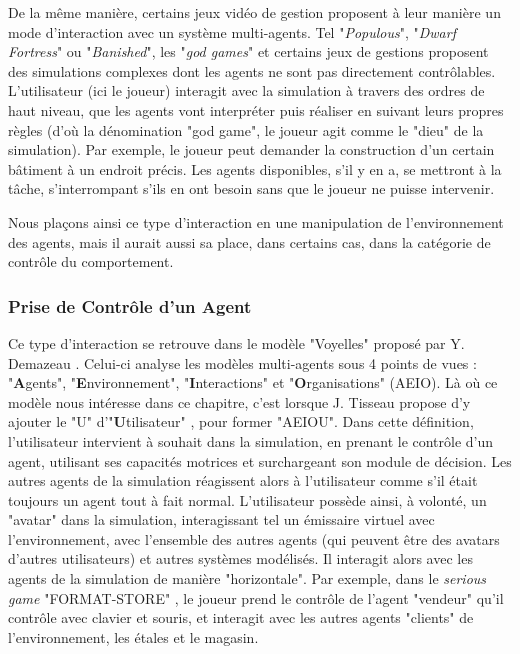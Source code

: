 		De la même manière, certains jeux vidéo de gestion proposent à leur manière un mode d'interaction avec un système multi-agents. Tel "\textit{Populous}", "\textit{Dwarf Fortress}" ou "\textit{Banished}", les "\textit{god games}" et certains jeux de gestions proposent des simulations complexes dont les agents ne sont pas directement contrôlables. L'utilisateur (ici le joueur) interagit avec la simulation à travers des ordres de haut niveau, que les agents vont interpréter puis réaliser en suivant leurs propres règles (d'où la dénomination "god game", le joueur agit comme le "dieu" de la simulation). Par exemple, le joueur peut demander la construction d'un certain bâtiment à un endroit précis. Les agents disponibles, s'il y en a, se mettront à la tâche, s'interrompant s'ils en ont besoin sans que le joueur ne puisse intervenir. 
		
		Nous plaçons ainsi ce type d'interaction en une manipulation de l'environnement des agents, mais il aurait aussi sa place, dans certains cas, dans la catégorie de contrôle du comportement.
	
	\subsubsection{Prise de Contrôle d'un Agent}
		Ce type d'interaction se retrouve dans le modèle "Voyelles" proposé par Y. Demazeau \cite{demazeau_interactions_1995}. Celui-ci analyse les modèles multi-agents sous 4 points de vues : "\textbf{A}gents", "\textbf{E}nvironnement", "\textbf{I}nteractions" et "\textbf{O}rganisations" (AEIO). Là où ce modèle nous intéresse dans ce chapitre, c'est lorsque J. Tisseau propose d'y ajouter le "U" d'"\textbf{U}tilisateur" \cite{tisseau_realite_2001}, pour former "AEIOU". Dans cette définition, l'utilisateur intervient à souhait dans la simulation, en prenant le contrôle d'un agent, utilisant ses capacités motrices et surchargeant son module de décision. Les autres agents de la simulation réagissent alors à l'utilisateur comme s'il était toujours un agent tout à fait normal. 
		L'utilisateur possède ainsi, à volonté, un "avatar" dans la simulation, interagissant tel un émissaire virtuel avec l'environnement, avec l'ensemble des autres agents (qui peuvent être des avatars d'autres utilisateurs) et autres systèmes modélisés. Il interagit alors avec les agents de la simulation de manière "horizontale". Par exemple, dans le \textit{serious game} "FORMAT-STORE" \cite{mathieu_serious_2011}, le joueur prend le contrôle de l'agent "vendeur" qu'il contrôle avec clavier et souris, et interagit avec les autres agents "clients" de l'environnement, les étales et le magasin.
		
